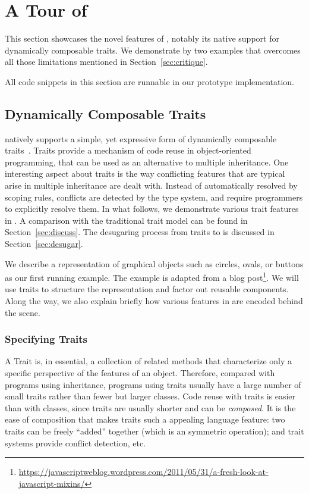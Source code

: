 \section{A Tour of \name}

This section showcases the novel features of \name, notably its native support
for dynamically composable traits. We demonstrate by two examples that \name
overcomes all those limitations mentioned in Section~\ref{sec:critique}.

All code snippets in this section are runnable in our prototype
implementation.


\subsection{Dynamically Composable Traits}
\label{sec:traits}

\name natively supports a simple, yet expressive form of dynamically composable
traits~\cite{scharli2003traits}. Traits provide a mechanism of code reuse in
object-oriented programming, that can be used as an alternative to multiple
inheritance. One interesting aspect about traits is the way conflicting features
that are typical arise in multiple inheritance are dealt with. Instead of
automatically resolved by scoping rules, conflicts are detected by the type
system, and require programmers to explicitly resolve them. In what follows, we
demonstrate various trait features in \name. A comparison with the traditional
trait model can be found in Section~\ref{sec:discuss}. The desugaring process
from traits to \bname is discussed in Section~\ref{sec:desugar}.

We describe a representation of graphical objects such as circles, ovals, or
buttons as our first running example. The example is adapted from a blog
post\footnote{\url{https://javascriptweblog.wordpress.com/2011/05/31/a-fresh-look-at-javascript-mixins/}}.
We will use traits to structure the representation and factor out reusable
components. Along the way, we also explain briefly how various features in \name
are encoded behind the scene.


\subsubsection{Specifying Traits}

A Trait is, in essential, a collection of related methods that characterize only
a specific perspective of the features of an object. Therefore, compared with
programs using inheritance, programs using traits usually have a large number of
small traits rather than fewer but larger classes. Code reuse with traits is
easier than with classes, since traits are usually shorter and can be
\textit{composed}. It is the ease of composition that makes traits such a
appealing language feature: two traits can be freely ``added'' together (which
is an symmetric operation); and trait systems provide conflict detection, etc.

